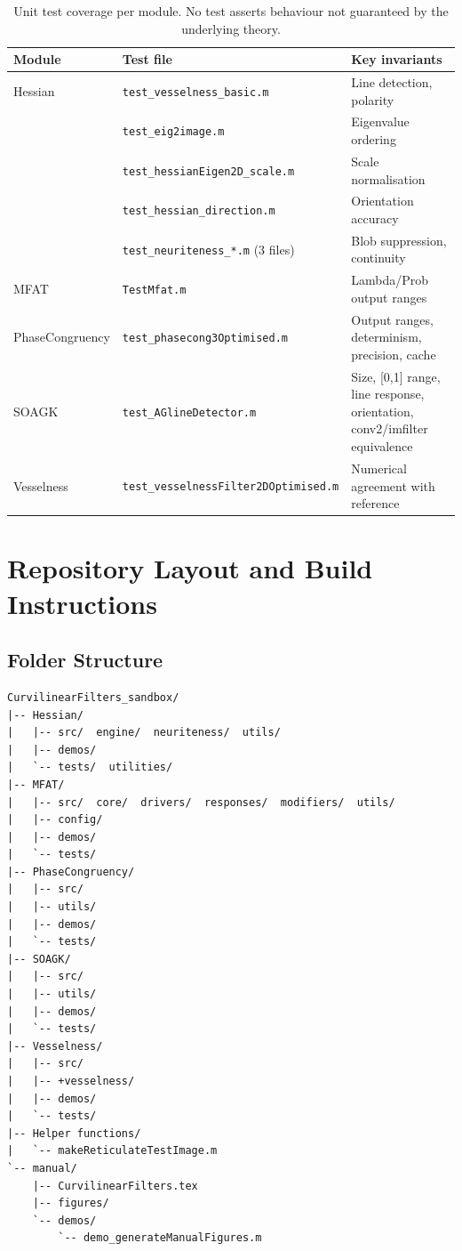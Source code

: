 \documentclass[a4paper,justified]{tufte-book}
\begin{document}
\begin{table}[ht]
  \centering
  \footnotesize
  \begin{tabular}{lll}
    \toprule
    Module & Test file & Key invariants \\
    \midrule
    Hessian & \texttt{test\_vesselness\_basic.m} & Line detection, polarity \\
            & \texttt{test\_eig2image.m} & Eigenvalue ordering \\
            & \texttt{test\_hessianEigen2D\_scale.m} & Scale normalisation \\
            & \texttt{test\_hessian\_direction.m} & Orientation accuracy \\
            & \texttt{test\_neuriteness\_*.m} (3 files) & Blob suppression, continuity \\[2pt]
    MFAT    & \texttt{TestMfat.m} & Lambda/Prob output ranges \\[2pt]
    PhaseCongruency & \texttt{test\_phasecong3Optimised.m}
            & Output ranges, determinism, precision, cache \\[2pt]
    SOAGK   & \texttt{test\_AGlineDetector.m}
            & Size, [0,1] range, line response, orientation,
              conv2/imfilter equivalence \\[2pt]
    Vesselness & \texttt{test\_vesselnessFilter2DOptimised.m}
            & Numerical agreement with reference \\
    \bottomrule
  \end{tabular}
  \caption{Unit test coverage per module. No test asserts behaviour not
  guaranteed by the underlying theory.}
\end{table}

\section{Repository Layout and Build Instructions}

\subsection{Folder Structure}

\begin{verbatim}
CurvilinearFilters_sandbox/
|-- Hessian/
|   |-- src/  engine/  neuriteness/  utils/
|   |-- demos/
|   `-- tests/  utilities/
|-- MFAT/
|   |-- src/  core/  drivers/  responses/  modifiers/  utils/
|   |-- config/
|   |-- demos/
|   `-- tests/
|-- PhaseCongruency/
|   |-- src/
|   |-- utils/
|   |-- demos/
|   `-- tests/
|-- SOAGK/
|   |-- src/
|   |-- utils/
|   |-- demos/
|   `-- tests/
|-- Vesselness/
|   |-- src/
|   |-- +vesselness/
|   |-- demos/
|   `-- tests/
|-- Helper functions/
|   `-- makeReticulateTestImage.m
`-- manual/
    |-- CurvilinearFilters.tex
    |-- figures/
    `-- demos/
        `-- demo_generateManualFigures.m
\end{verbatim}
\end{document}
